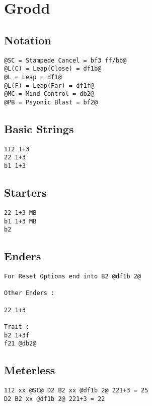 \documentclass[main.tex]{subfiles}
\begin{document}
\chapter{Grodd}

\section{Notation}
\begin{lstlisting}[language=FG]
@SC = Stampede Cancel = bf3 ff/bb@
@L(C) = Leap(Close) = df1b@
@L = Leap = df1@
@L(F) = Leap(Far) = df1f@
@MC = Mind Control = db2@
@PB = Psyonic Blast = bf2@
\end{lstlisting}


\section{Basic Strings}

\begin{lstlisting}[language=FG]
112 1+3
22 1+3
b1 1+3
\end{lstlisting}

\section{Starters}
\begin{lstlisting}[language=FG]
22 1+3 MB
b1 1+3 MB
b2

\end{lstlisting}

\section{Enders}

\begin{lstlisting}[language=FG]
For Reset Options end into B2 @df1b 2@ 

Other Enders :

22 1+3

Trait :
b2 1+3f
f21 @db2@
\end{lstlisting}

\section{Meterless}


\begin{lstlisting}[language=FG]
112 xx @SC@ D2 B2 xx @df1b 2@ 221+3 = 25
D2 B2 xx @df1b 2@ 221+3 = 22
\end{lstlisting}
\end{document}
